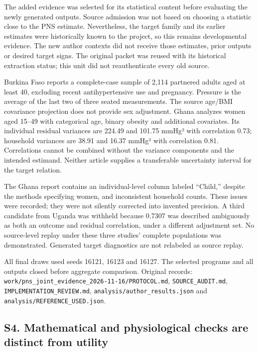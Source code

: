 \documentclass[11pt,letterpaper]{article}
\begin{document}
\endgroup

The added evidence was selected for its statistical content before evaluating the newly generated outputs. Source admission was not based on choosing a statistic close to the PNS estimate. Nevertheless, the target family and its earlier estimates were historically known to the project, so this remains developmental evidence. The new author contexts did not receive those estimates, prior outputs or desired target signs. The original packet was reused with its historical extraction status; this unit did not reauthenticate every old source.


Burkina Faso reports a complete-case sample of 2,114 partnered adults aged at least 40, excluding recent antihypertensive use and pregnancy. Pressure is the average of the last two of three seated measurements. The source age/\allowbreak{}BMI covariance projection does not provide sex adjustment. Ghana analyzes women aged 15–\allowbreak{}49 with categorical age, binary obesity and additional covariates. Its individual residual variances are 224.49 and 101.75 mmHg² with correlation 0.73; household variances are 38.91 and 16.37 mmHg² with correlation 0.81. Correlations cannot be combined without the variance components and the intended estimand. Neither article supplies a transferable uncertainty interval for the target relation.


The Ghana report contains an individual-level column labeled “Child,” despite the methods specifying women, and inconsistent household counts. These issues were recorded; they were not silently corrected into invented precision. A third candidate from Uganda was withheld because 0.7307 was described ambiguously as both an outcome and residual correlation, under a different adjustment set. No source-level replay under these three studies' complete populations was demonstrated. Generated target diagnostics are not relabeled as source replay.


All final draws used seeds 16121, 16123 and 16127. The selected programs and all outputs closed before aggregate comparison. Original records: \texttt{work/\allowbreak{}pns\_\allowbreak{}joint\_\allowbreak{}evidence\_\allowbreak{}2026-\allowbreak{}11-\allowbreak{}16/\allowbreak{}PROTOCOL.md}, \texttt{SOURCE\_\allowbreak{}AUDIT.md}, \texttt{IMPLEMENTATION\_\allowbreak{}REVIEW.md}, \texttt{analysis/\allowbreak{}author\_\allowbreak{}results.json} and \texttt{analysis/\allowbreak{}REFERENCE\_\allowbreak{}USED.json}.


\subsection*{S4. Mathematical and physiological checks are distinct from utility}
\end{document}
